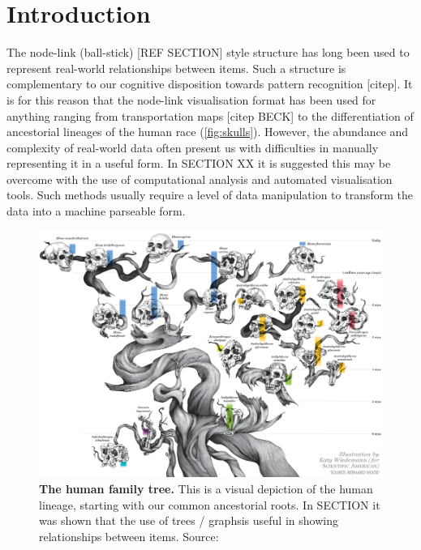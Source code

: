 
\section{Introduction}
The node-link (ball-stick) [REF SECTION] style structure has long been used to represent real-world relationships between items. Such a structure is complementary to our cognitive disposition towards pattern recognition [citep]. It is for this reason that the node-link visualisation format has been used for anything ranging from transportation maps [citep BECK] to the differentiation of ancestorial lineages of the human race (\autoref{fig:skulls}). However, the abundance and complexity of real-world data often present us with difficulties in manually representing it in a useful form. In SECTION XX it is suggested this may be overcome with the use of computational analysis and automated visualisation tools. Such methods usually require a level of data manipulation to transform the data into a machine parseable form. 

\begin{figure}[H]
     \centering
         \includegraphics[width=\textwidth]{figures_c3/humanskulls.png}

        \caption[Caption for LOF]{\textbf{The human family tree.} This is a visual depiction of the human lineage, starting with our common ancestorial roots. In SECTION it was shown that the use of trees / graphs\protect\footnotemark is useful in showing relationships between items. Source: \citep{skull}}
        \label{fig:skulls}
\end{figure}



